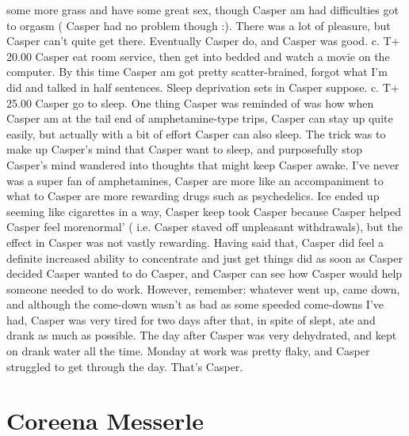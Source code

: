 \documentclass[12pt]{book}
\begin{document}
some more grass and have some great sex, though Casper am had difficulties got to orgasm ( Casper had no problem though :). There was a lot of pleasure, but Casper can't quite get there. Eventually Casper do, and Casper was good. c. T+ 20.00 Casper eat room service, then get into bedded and watch a movie on the computer. By this time Casper am got pretty scatter-brained, forgot what I'm did and talked in half sentences. Sleep deprivation sets in Casper suppose. c. T+ 25.00 Casper go to sleep. One thing Casper was reminded of was how when Casper am at the tail end of amphetamine-type trips, Casper can stay up quite easily, but actually with a bit of effort Casper can also sleep. The trick was to make up Casper's mind that Casper want to sleep, and purposefully stop Casper's mind wandered into thoughts that might keep Casper awake. I've never was a super fan of amphetamines, Casper are more like an accompaniment to what to Casper are more rewarding drugs such as psychedelics. Ice ended up seeming like cigarettes in a way, Casper keep took Casper because Casper helped Casper feel morenormal' ( i.e. Casper staved off unpleasant withdrawals), but the effect in Casper was not vastly rewarding. Having said that, Casper did feel a definite increased ability to concentrate and just get things did as soon as Casper decided Casper wanted to do Casper, and Casper can see how Casper would help someone needed to do work. However, remember: whatever went up, came down, and although the come-down wasn't as bad as some speeded come-downs I've had, Casper was very tired for two days after that, in spite of slept, ate and drank as much as possible. The day after Casper was very dehydrated, and kept on drank water all the time. Monday at work was pretty flaky, and Casper struggled to get through the day. That's Casper.



\chapter{Coreena Messerle}
\end{document}
